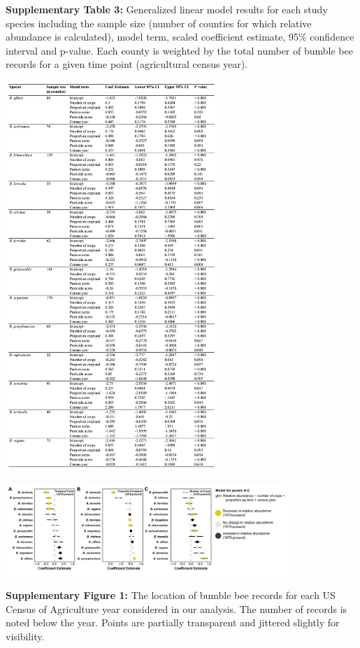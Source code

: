 \documentclass[11pt,]{article}
\begin{document}
\clearpage

\textbf{Supplementary Table 3:} Generalized linear model results for
each study species including the sample size (number of counties for
which relative abundance is calculated), model term, scaled coefficient
estimate, 95\% confidence interval and p-value. Each county is weighted
by the total number of bumble bee records for a given time point
(agricultural census year).

\includegraphics[width=0.6\textwidth,height=\textheight]{../ms_figs/tables2.png}

\clearpage

\newpage

\includegraphics[width=0.8\textwidth,height=\textheight]{../ms_figs/fig_s2.png}

\textbf{Supplementary Figure 1:} The location of bumble bee records for
each US Census of Agriculture year considered in our analysis. The
number of records is noted below the year. Points are partially
transparent and jittered slightly for visibility.
\end{document}

